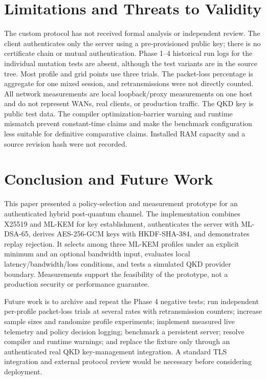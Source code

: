 \documentclass[journal]{IEEEtran}
\begin{document}
\section{Limitations and Threats to Validity}
The custom protocol has not received formal analysis or independent review. The client authenticates only the server using a pre-provisioned public key; there is no certificate chain or mutual authentication. Phase 1--4 historical run logs for the individual mutation tests are absent, although the test variants are in the source tree. Most profile and grid points use three trials. The packet-loss percentage is aggregate for one mixed session, and retransmissions were not directly counted. All network measurements are local loopback/proxy measurements on one host and do not represent WANs, real clients, or production traffic. The QKD key is public test data. The compiler optimization-barrier warning and runtime mismatch prevent constant-time claims and make the benchmark configuration less suitable for definitive comparative claims. Installed RAM capacity and a source revision hash were not recorded.

\section{Conclusion and Future Work}
This paper presented a policy-selection and measurement prototype for an authenticated hybrid post-quantum channel. The implementation combines X25519 and ML-KEM for key establishment, authenticates the server with ML-DSA-65, derives AES-256-GCM keys with HKDF-SHA-384, and demonstrates replay rejection. It selects among three ML-KEM profiles under an explicit minimum and an optional bandwidth input, evaluates local latency/bandwidth/loss conditions, and tests a simulated QKD provider boundary. Measurements support the feasibility of the prototype, not a production security or performance guarantee.

Future work is to archive and repeat the Phase 4 negative tests; run independent per-profile packet-loss trials at several rates with retransmission counters; increase sample sizes and randomize profile experiments; implement measured live telemetry and policy decision logging; benchmark a persistent server; resolve compiler and runtime warnings; and replace the fixture only through an authenticated real QKD key-management integration. A standard TLS integration and external protocol review would be necessary before considering deployment.
\end{document}
